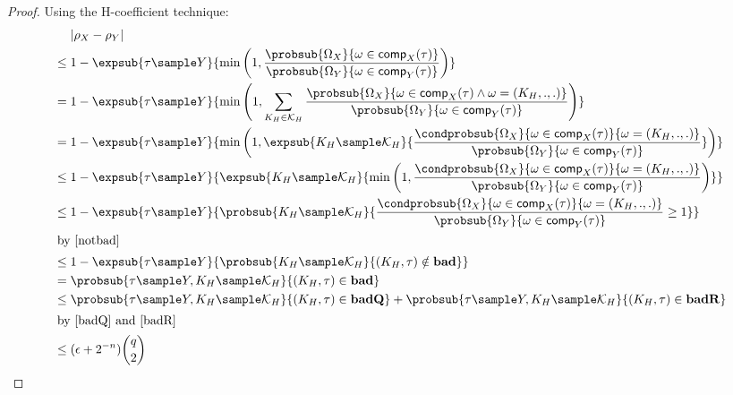 \documentclass[eprint.tex]{subfiles}
\begin{document}
\begin{proof} Using the H-coefficient technique:
    \begin{align*}
        {}&|\rho_X - \rho_Y| \\
        \leq{}& 1 - \expsub{\tau \sample Y}{\minone{
               \frac{\probsub{\Omega_X}{\omega \in \comp_X(\tau)}}
               {\probsub{\Omega_Y}{\omega \in \comp_Y(\tau)}}
            }} \\
        ={}& 1 - \expsub{\tau \sample Y}{\minone{
            \sum_{K_H \in \mathcal{K}_H}
              \frac{\probsub{\Omega_X}{\omega \in \comp_X(\tau) \wedge \omega = (K_H, ., .)}}
              {\probsub{\Omega_Y}{\omega \in \comp_Y(\tau)}}
            }} \\
        ={}& 1 - \expsub{\tau \sample Y}{\minone{
            \expsub{K_H \sample \mathcal{K}_H}{
              \frac{\condprobsub{\Omega_X}{\omega \in \comp_X(\tau)}{\omega = (K_H, ., .)}}
              {\probsub{\Omega_Y}{\omega \in \comp_Y(\tau)}}}
            }} \\
        \leq{}& 1 - \expsub{\tau \sample Y}{
            \expsub{K_H \sample \mathcal{K}_H}{
              \minone{
              \frac{\condprobsub{\Omega_X}{\omega \in \comp_X(\tau)}{\omega = (K_H, ., .)}}
              {\probsub{\Omega_Y}{\omega \in \comp_Y(\tau)}}
              }}
            } \\
        \leq{}& 1 - \expsub{\tau \sample Y}{
            \probsub{K_H \sample \mathcal{K}_H}{
                \frac{\condprobsub{\Omega_X}{\omega \in \comp_X(\tau)}{\omega = (K_H, ., .)}}
                {\probsub{\Omega_Y}{\omega \in \comp_Y(\tau)}} \geq 1
            }} \\
        \intertext{by \autoref{notbad}}
        \leq{}& 1 - \expsub{\tau \sample Y}{
            \probsub{K_H \sample \mathcal{K}_H}{(K_H, \tau) \notin \bad}} \\
        = {}& \probsub{\tau \sample Y, K_H \sample \mathcal{K}_H}{(K_H, \tau) \in \bad} \\
        \leq {}& \probsub{\tau \sample Y, K_H \sample \mathcal{K}_H}{(K_H, \tau) \in \badQ}
         + \probsub{\tau \sample Y, K_H \sample \mathcal{K}_H}{(K_H, \tau) \in \badR} \\
         \intertext{by \autoref{badQ} and \autoref{badR}}
        \leq {}& (\epsilon + 2^{-n})\binom{q}{2} \qedhere \\
    \end{align*}
\end{proof}
\end{document}
